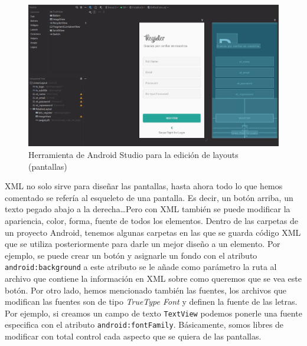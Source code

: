 \begin{figure}[h!]
  \centering
  \includegraphics[width=1\linewidth]{figs/Desarrollo/XML/androidStudio}
  \caption[XML Herramienta Android Studio]{Herramienta de Android Studio para la edición de layouts (pantallas)}
  \label{fig:herramienta_android}
\end{figure}

XML no solo sirve para diseñar las pantallas, hasta ahora todo lo que hemos comentado se refería al esqueleto de una pantalla. Es decir, un botón arriba, un texto pegado abajo a la derecha\dots Pero con XML también se puede modificar la apariencia, color, forma, fuente de todos los elementos. Dentro de las carpetas de un proyecto Android, tenemos algunas carpetas en las que se guarda código XML que se utiliza posteriormente para darle un mejor diseño a un elemento. Por ejemplo, se puede crear un botón y asignarle un fondo con el atributo \verb|android:background| a este atributo se le añade como parámetro la ruta al archivo que contiene la información en XML sobre como queremos que se vea este botón. Por otro lado, hemos mencionado también las fuentes, los archivos que modifican las fuentes son de tipo \emph{TrueType Font} y definen la fuente de las letras. Por ejemplo, si creamos un campo de texto \verb|TextView| podemos ponerle una fuente especifica con el atributo \verb|android:fontFamily|. Básicamente, somos libres de modificar con total control cada aspecto que se quiera de las pantallas. \\

